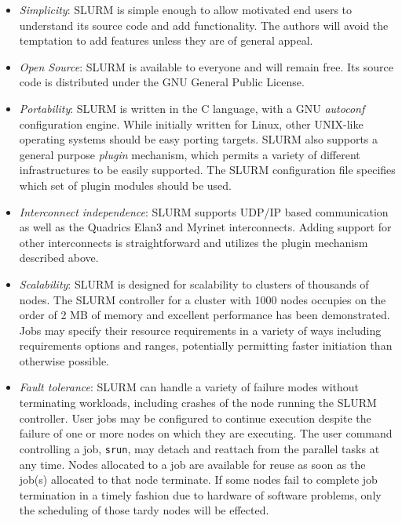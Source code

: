 \documentclass{article}
\begin{document}
\begin{itemize}
\item {\em Simplicity}: SLURM is simple enough to allow motivated end users
to understand its source code and add functionality.  The authors will 
avoid the temptation to add features unless they are of general appeal. 

\item {\em Open Source}: SLURM is available to everyone and will remain free. 
Its source code is distributed under the GNU General Public 
License\cite{GPL2002}.

\item {\em Portability}: SLURM is written in the C language, with a GNU 
{\em autoconf} configuration engine.  
While initially written for Linux, other UNIX-like operating systems 
should be easy porting targets.
SLURM also supports a general purpose {\em plugin} mechanism, which 
permits a variety of different infrastructures to be easily supported. 
The SLURM configuration file specifies which set of plugin modules 
should be used. 

\item {\em Interconnect independence}: SLURM supports UDP/IP based
communication as well as the Quadrics Elan3 and Myrinet interconnects.  
Adding support for other interconnects is straightforward and utilizes 
the plugin mechanism described above.

\item {\em Scalability}: SLURM is designed for scalability to clusters of
thousands of nodes. The SLURM controller for a cluster with 1000 nodes 
occupies on the order of 2 MB of memory and excellent performance has 
been demonstrated. 
Jobs may specify their resource requirements in a variety of ways 
including requirements options and ranges, potentially permitting 
faster initiation than otherwise possible.

\item {\em Fault tolerance}: SLURM can handle a variety of failure modes
without terminating workloads, including crashes of the node running 
the SLURM controller. 
User jobs may be configured to continue execution despite the failure 
of one or more nodes on which they are executing. 
The user command controlling a job, {\tt srun}, may detach and reattach 
from the parallel tasks at any time. 
Nodes allocated to a job are available for reuse as soon as the job(s) 
allocated to that node terminate. 
If some nodes fail to complete job termination 
in a timely fashion due to hardware of software problems, only the 
scheduling of those tardy nodes will be effected.


\end{itemize}
\end{document}

